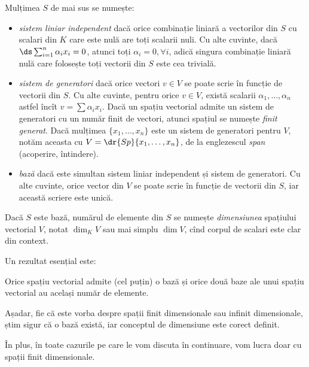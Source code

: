 \begin{definition}\label{def:indep-sg-baza}
    Mulțimea $ S $ de mai sus se numește:
    \begin{itemize}
        \item \emph{sistem liniar independent} dacă orice combinație liniară a vectorilor
            din $ S $ cu scalari din $ K $ care este nulă are toți scalarii nuli.
            Cu alte cuvinte, dacă $ \ds\sum_{i=1}^n \alpha_i x_i = 0 $, atunci toți
            $ \alpha_i = 0, \forall i $, adică singura combinație liniară nulă care
            folosește toți vectorii din $ S $ este cea trivială.
        \item \emph{sistem de generatori} dacă orice vectori $ v \in V $ se poate
            scrie în funcție de vectorii din $ S $. Cu alte cuvinte, pentru orice
            $ v \in V $, există scalarii $ \alpha_1, \dots, \alpha_n $
            astfel încît $ v = \sum \alpha_i x_i $. Dacă un spațiu vectorial admite
            un sistem de generatori cu un număr finit de vectori, atunci spațiul
            se numește \emph{finit generat}. Dacă mulțimea $ \{x_1, \dots, x_n \} $
            este un sistem de generatori pentru $ V $, notăm aceasta cu
            $ V = \dr{Sp}\{x_1, \dots, x_n\} $, de la englezescul \emph{span} (acoperire, întindere).
        \item \emph{bază} dacă este simultan sistem liniar independent și sistem
            de generatori. Cu alte cuvinte, orice vector din $ V $ se poate scrie
            în funcție de vectorii din $ S $, iar această scriere este unică.
    \end{itemize}
    Dacă $ S $ este bază, numărul de elemente din $ S $ se numește \emph{dimensiunea}
    spațiului vectorial $ V $, notat $ \dim_K V $ sau mai simplu $ \dim V $, cînd
    corpul de scalari este clar din context.
\end{definition}

Un rezultat esențial este:
\begin{theorem}\label{thm:exist-baza}
    Orice spațiu vectorial admite (cel puțin) o bază și orice două baze ale unui
    spațiu vectorial au același număr de elemente.
\end{theorem}

Așadar, fie că este vorba despre spații finit dimensionale sau infinit dimensionale,
știm sigur că o bază există, iar conceptul de dimensiune este corect definit.

În plus, în toate cazurile pe care le vom discuta în continuare, vom lucra
doar cu spații finit dimensionale.


